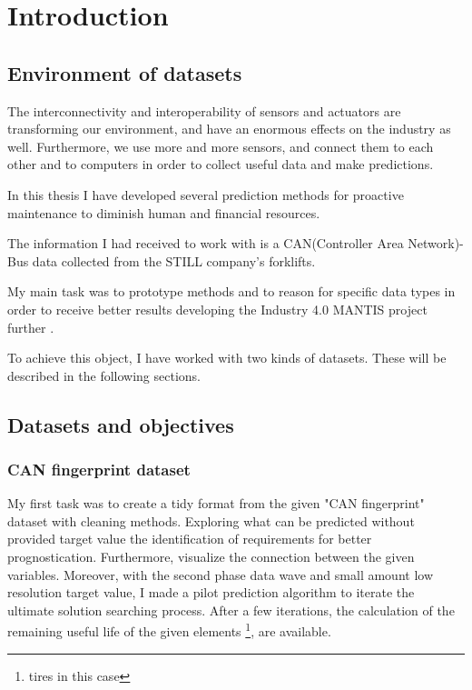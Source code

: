 \chapter{Introduction}
\section{Environment of datasets}
The interconnectivity and interoperability \cite{TalebArchInsSys} of sensors and actuators are transforming our environment, and have an enormous effects on the industry as well. Furthermore, we use more and more sensors, and connect them to each other and to computers in order to collect useful data and make predictions.

In this thesis I have developed several prediction methods for proactive maintenance to diminish human and financial resources.

The information I had received to work with is a CAN(Controller Area Network)-Bus data collected from the STILL company's forklifts.

My main task was to prototype methods and to reason for specific data types in order to receive better results developing the Industry 4.0 \cite{Indfourpointzero} MANTIS project further \cite{PaliHCsCPS,HCsCPS2,GartnerIoT,HuangCPS,PaliCPS,HCsCPS,ProMain}.

To achieve this object, I have worked with two kinds of datasets. These will be described in the following sections.
\section{Datasets and objectives}
    \subsection{CAN fingerprint dataset}
\noindent
My first task was to create a tidy format from the given "CAN fingerprint" dataset with cleaning methods. Exploring what can be predicted without provided target value  the identification of requirements for better prognostication. Furthermore, visualize the connection between the given variables. Moreover, with the second phase data wave and small amount low resolution target value, I made a pilot prediction algorithm to iterate the ultimate solution searching process. 
\noindent
After a few iterations, the calculation of the remaining useful life of the given elements \footnote{tires in this case}, are available. 
